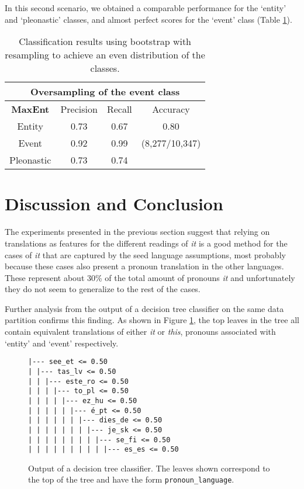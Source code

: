 \documentclass[10pt, a4paper]{article}
\begin{document}
In this second scenario, we obtained a comparable performance for the `entity' and `pleonastic' classes, and almost perfect scores for the `event' class (Table \ref{tab:maxentoversampling}). 

\begin{center} \begin{table}[h!] \begin{tabular}{cccc}
\multicolumn{4}{c}{\textbf{Oversampling of the event class}}\\ 
\toprule
\textbf{MaxEnt}& Precision & Recall & Accuracy \\ 
\midrule 
 Entity & 0.73 &0.67& 0.80 \\ 
 Event & 0.92 & 0.99 & (8,277/10,347) \\ 
  Pleonastic &  0.73 & 0.74 & \\
\bottomrule 
\end{tabular} 
\caption{Classification results using bootstrap with 
resampling to achieve an even distribution of the classes.}\label{tab:maxentoversampling}
\end{table}
\end{center}





\section{Discussion and Conclusion}

The experiments presented in the previous section suggest that relying on 
translations as features for the different readings of \textit{it} is a good 
method for 
the cases of \textit{it} that are captured by the seed language assumptions, 
most probably because  
these cases also present a pronoun translation in the other languages. These 
represent about 30\% of the total amount of pronouns 
\textit{it} and unfortunately they do not seem to generalize to the rest of the 
cases. 

Further analysis from the output of a decision tree classifier on the same data 
partition confirms this finding. As shown in Figure \ref{fig:decisiontree}, the 
top leaves in the tree all contain equivalent translations of either \textit{it} or 
\textit{this}, pronouns associated with `entity' and `event' respectively. 


\begin{figure}\small
\begin{verbatim}
|--- see_et <= 0.50
| |--- tas_lv <= 0.50
| | |--- este_ro <= 0.50
| | | |--- to_pl <= 0.50
| | | | |--- ez_hu <= 0.50
| | | | | |--- é_pt <= 0.50
| | | | | | |--- dies_de <= 0.50
| | | | | | | |--- je_sk <= 0.50
| | | | | | | | |--- se_fi <= 0.50
| | | | | | | | | |--- es_es <= 0.50
\end{verbatim}
\caption{Output of a decision tree classifier. The leaves shown correspond to
the top of the tree and have the form \texttt{pronoun\_language}.}\label{fig:decisiontree}
\end{figure}
\end{document}
